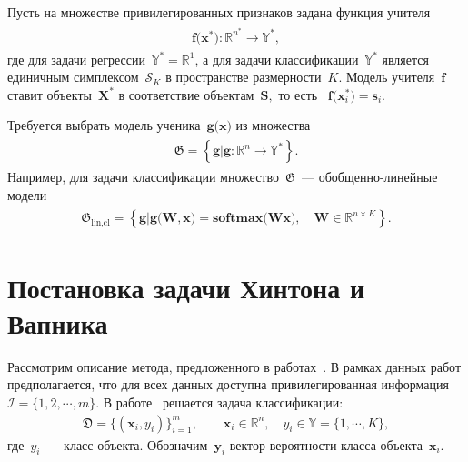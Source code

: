 \documentclass[12pt]{a&t}
\begin{document}
Пусть на множестве привилегированных признаков задана функция учителя
\begin{gather}
\label{eq:st:4}
\begin{aligned}
\mathbf{f}\bigr(\mathbf{x}^*\bigr):\mathbb{R}^{n^*} \to \mathbb{Y}^*,
\end{aligned}
\end{gather}
где для задачи регрессии~$\mathbb{Y}^*=\mathbb{R}^1$, а для задачи классификации~$\mathbb{Y}^*$ является единичным симплексом~$\mathcal{S}_K$ в пространстве размерности~$K$. Модель учителя~$\mathbf{f}$ ставит объекты~$\mathbf{X}^*$ в соответствие объектам~$\mathbf{S},$ то есть ~$\mathbf{f}\bigr(\mathbf{x}^*_i\bigr)=\mathbf{s}_i$.

Требуется выбрать модель ученика~$\mathbf{g}\bigr(\mathbf{x}\bigr)$ из множества
\begin{gather}
\label{eq:st:G}
\begin{aligned}
\mathfrak{G} = \left\{\mathbf{g}| \mathbf{g}:\mathbb{R}^{n} \to \mathbb{Y}^*\right\}.
\end{aligned}
\end{gather}
Например, для задачи классификации множество~$\mathfrak{G}$~--- обобщенно-линейные модели
\begin{gather}
\label{eq:st:G:lin:cl}
\begin{aligned}
\mathfrak{G}_\text{lin,cl} = \left\{\mathbf{g}|\mathbf{g}\bigr(\mathbf{W}, \mathbf{x}\bigr) = \textbf{softmax}\bigr(\mathbf{W}\mathbf{x}\bigr), \quad \mathbf{W} \in \mathbb{R}^{n\times K}\right\}.
\end{aligned}
\end{gather}

\section{Постановка задачи Хинтона и Вапника}\label{state:hinton}
Рассмотрим описание метода, предложенного в работах~\cite{Hinton2015, Lopez2016}. В рамках данных работ предполагается, что для всех данных доступна привилегированная информация~$\mathcal{I} = \{1, 2, \cdots, m\}$. В работе~\cite{Hinton2015} решается задача классификации:
\begin{gather}
    \mathfrak{D} = \{\left(\mathbf{x}_i, y_i\right)\}_{i=1}^{m}, \qquad \mathbf{x}_i \in \mathbb{R}^{n}, \quad y_i \in \mathbb{Y}=\{1, \cdots, K\},
\end{gather}
где~$y_i$~--- класс объекта. Обозначим~$\mathbf{y}_i$ вектор вероятности  класса объекта~$\mathbf{x}_i$.
\end{document}
